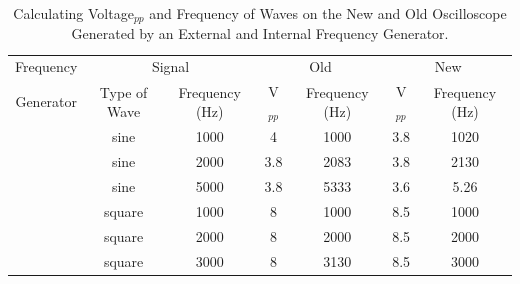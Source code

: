 \documentclass{article}
\begin{document}
	\begin{table}[ht]
		\begin{center}
			\captionsetup{justification=centering,margin=2cm}
		\caption{Calculating Voltage$_{pp}$ and Frequency of Waves on the New and Old Oscilloscope Generated by an External and Internal Frequency Generator.}
		\begin{tabular}{c|c|c|c|c|c|c}
		   Frequency	& \multicolumn{2}{c|}{Signal}& \multicolumn{2}{c|}{Old}& \multicolumn{2}{c}{New}\\
			\cline{2-7}
			Generator&Type of Wave &Frequency (Hz)&V$_{pp}$&Frequency (Hz)&V$_{pp}$&Frequency (Hz)\\
			\hline
			\cellcolor{white} &sine &  1000 & 4 & 1000 & 3.8 & 1020 \\
			\cellcolor{white} &sine &2000&3.8&2083&3.8&2130\\
			\cellcolor{white}\multirow{-3}{*}{External}&sine&5000&3.8&5333&3.6&5.26\\
			\hline
			\cellcolor{white} &square&1000&8&1000&8.5&1000\\
			\cellcolor{white}&square&2000&8&2000&8.5&2000\\
			\cellcolor{white} \multirow{-3}{*}{Oscilloscope}&square&3000&8&3130&8.5&3000\\
		\end{tabular}
	\end{center}
	\end{table}
\end{document}
